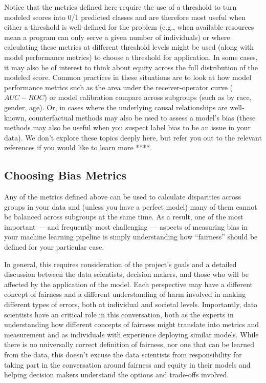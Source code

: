 \documentclass[]{krantz}
\begin{document}
Notice that the metrics defined here require the use of a threshold to
turn modeled scores into 0/1 predicted classes and are therefore most
useful when either a threshold is well-defined for the problem (e.g.,
when available resources mean a program can only serve a given number of
individuals) or where calculating these metrics at different threshold
levels might be used (along with model performance metrics) to choose a
threshold for application. In some cases, it may also be of interest to
think about equity across the full distribution of the modeled score.
Common practices in these situations are to look at how model
performance metrics such as the area under the receiver-operator curve
(\(AUC-ROC\)) or model calibration compare across subgroups (such as by
race, gender, age). Or, in cases where the underlying causal
relationships are well-known, counterfactual methods may also be used to
assess a model's bias (these methods may also be useful when you suspect
label bias to be an issue in your data). We don't explore these topics
deeply here, but refer you out to the relevant references if you would
like to learn more ****.

\subsection{Choosing Bias Metrics}\label{choosing-bias-metrics}

Any of the metrics defined above can be used to calculate disparities
across groups in your data and (unless you have a perfect model) many of
them cannot be balanced across subgroups at the same time. As a result,
one of the most important --- and frequently most challenging ---
aspects of measuring bias in your machine learning pipeline is simply
understanding how ``fairness'' should be defined for your particular
case.

In general, this requires consideration of the project's goals and a
detailed discussion between the data scientists, decision makers, and
those who will be affected by the application of the model. Each
perspective may have a different concept of fairness and a different
understanding of harm involved in making different types of errors, both
at individual and societal levels. Importantly, data scientists have an
critical role in this conversation, both as the experts in understanding
how different concepts of fairness might translate into metrics and
measurement and as individuals with experience deploying similar models.
While there is no universally correct definition of fairness, nor one
that can be learned from the data, this doesn't excuse the data
scientists from responsibility for taking part in the conversation
around fairness and equity in their models and helping decision makers
understand the options and trade-offs involved.
\end{document}
